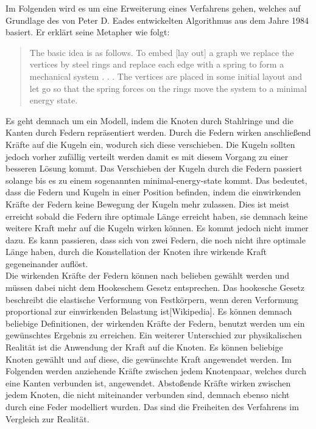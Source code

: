 Im Folgenden wird es um eine Erweiterung eines Verfahrens gehen, welches auf Grundlage des von Peter D. Eades entwickelten Algorithmus aus dem Jahre 1984 basiert. Er erklärt seine Metapher wie folgt:

\begin{quote}
	The basic idea is as follows. To embed [lay out] a graph we replace the
	vertices by steel rings and replace each edge with a spring to form a
	mechanical system . . . The vertices are placed in some initial layout and
	let go so that the spring forces on the rings move the system to a minimal
	energy state.
\end{quote}

Es geht demnach um ein Modell, indem die Knoten durch Stahlringe und die Kanten durch Federn repräsentiert werden. Durch die Federn wirken anschließend Kräfte auf die Kugeln ein, wodurch sich diese verschieben. Die Kugeln sollten jedoch vorher zufällig verteilt werden damit es mit diesem Vorgang zu einer besseren Lösung kommt. 
Das Verschieben der Kugeln durch die Federn passiert solange bis es zu einem sogenannten minimal-energy-state kommt. Das bedeutet, dass die Federn und Kugeln in einer Position befinden, indem die einwirkenden Kräfte der Federn keine Bewegung der Kugeln mehr zulassen. Dies ist meist erreicht sobald die Federn ihre optimale Länge erreicht haben, sie demnach keine weitere Kraft mehr auf die Kugeln wirken können. Es kommt jedoch nicht immer dazu. Es kann passieren, dass sich von zwei Federn, die noch nicht ihre optimale Länge haben, durch die Konstellation der Knoten ihre wirkende Kraft gegeneinander auflöst.\\

Die wirkenden Kräfte der Federn können nach belieben gewählt werden und müssen dabei nicht dem Hookeschem Gesetz entsprechen. Das hookesche Gesetz beschreibt die elastische Verformung von Festkörpern, wenn deren Verformung proportional zur einwirkenden Belastung ist[Wikipedia]. Es können demnach beliebige Definitionen, der wirkenden Kräfte der Federn, benutzt werden um ein gewünschtes Ergebnis zu erreichen. Ein weiterer Unterschied zur physikalischen Realität ist die Anwendung der Kraft auf die Knoten. Es können beliebige Knoten gewählt und auf diese, die gewünschte Kraft angewendet werden. Im Folgenden werden anziehende Kräfte zwischen jedem Knotenpaar, welches durch eine Kanten verbunden ist, angewendet. Abstoßende Kräfte wirken zwischen jedem Knoten, die nicht miteinander verbunden sind, demnach ebenso nicht durch eine Feder modelliert wurden. Das sind die Freiheiten des Verfahrens im Vergleich zur Realität. \\

